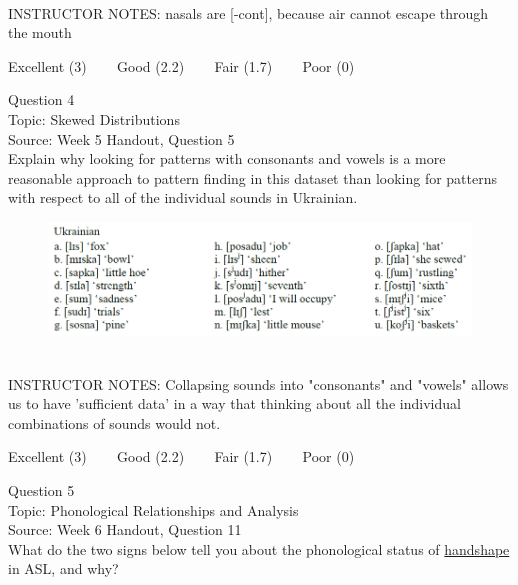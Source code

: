 \documentclass[12pt]{article}
\begin{document}
~\\
INSTRUCTOR NOTES: nasals are [-cont], because air cannot escape through the mouth


\vfill
Excellent (3) ~~~ Good (2.2) ~~~ Fair (1.7) ~~~ Poor (0)
\newpage

{\large Question 4}\\

Topic: Skewed Distributions\\
Source: Week 5 Handout, Question 5\\

Explain why looking for patterns with consonants and vowels is a more reasonable approach to pattern finding in this dataset than looking for patterns with respect to all of the individual sounds in Ukrainian.\\

\begin{figure}[H]
\includegraphics{../images/ukrainian.png}
\end{figure}

~\\
INSTRUCTOR NOTES: Collapsing sounds into "consonants" and "vowels" allows us to have 'sufficient data' in a way that thinking about all the individual combinations of sounds would not.


\vfill
Excellent (3) ~~~ Good (2.2) ~~~ Fair (1.7) ~~~ Poor (0)
\newpage

{\large Question 5}\\

Topic: Phonological Relationships and Analysis\\
Source: Week 6 Handout, Question 11\\

What do the two signs below tell you about the phonological status of \underline{handshape} in ASL, and why?\\
\end{document}
